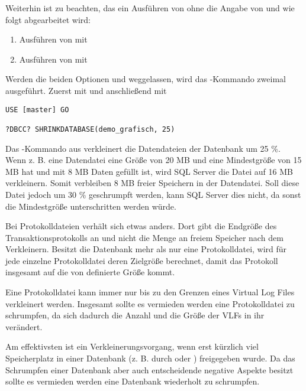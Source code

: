           Weiterhin ist zu beachten, das ein Ausführen von
           ohne die Angabe von
           und  wie folgt
          abgearbeitet wird:
          \begin{enumerate}
            \item Ausführen von  mit
            \item Ausführen von  mit
          \end{enumerate}
          \begin{merke}
            Werden die beiden Optionen  und
             weggelassen, wird das
            -Kommando zweimal ausgeführt. Zuerst mit
             und anschließend mit
          \end{merke}        
          \begin{lstlisting}[language=ms_sql,caption={Verkleinern einer
          Datenbank},label=admin03_35]
USE [master] GO

?DBCC? SHRINKDATABASE(demo_grafisch, 25)
          \end{lstlisting}          
          Das -Kommando aus 
          verkleinert die Datendateien der Datenbank 
          um 25 \%. Wenn z. B. eine Datendatei eine Größe von 20 MB und
          eine Mindestgröße von 15 MB hat und mit 8 MB Daten gefüllt ist, wird SQL
          Server die Datei auf 16 MB verkleinern. Somit verbleiben 8 MB freier
          Speichern in der Datendatei. Soll diese Datei jedoch um 30 \%
          geschrumpft werden, kann SQL Server dies nicht, da sonst die
          Mindestgröße unterschritten werden würde.
        
          Bei Protokolldateien verhält sich  etwas
          anders. Dort gibt  die Endgröße des
          Transaktionsprotokolls an und nicht die Menge an freiem Speicher nach
          dem Verkleinern. Besitzt die Datenbank mehr als nur eine Protokolldatei,
          wird für jede einzelne Protokolldatei deren Zielgröße berechnet, damit
          das Protokoll insgesamt auf die von 
          definierte Größe kommt.
          \begin{merke}
            Eine Protokolldatei kann immer nur bis zu den Grenzen eines Virtual
            Log Files verkleinert werden. Insgesamt sollte es vermieden werden
            eine Protokolldatei zu schrumpfen, da sich dadurch die Anzahl und die
            Größe der VLFs in ihr verändert.
          \end{merke}
          Am effektivsten ist ein Verkleinerungsvorgang, wenn erst kürzlich viel
          Speicherplatz in einer Datenbank (z. B. durch 
          oder ) freigegeben wurde. Da das Schrumpfen
          einer Datenbank aber auch entscheidende negative Aspekte besitzt sollte
          es vermieden werden eine Datenbank wiederholt zu schrumpfen.

